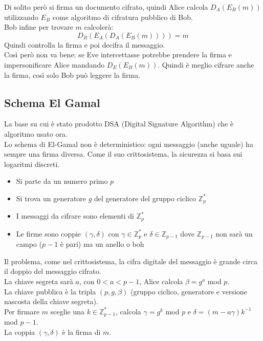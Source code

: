 Di solito però si firma un documento cifrato, quindi Alice calcola $D_A(E_B(m))$ utilizzando $E_B$ come algoritmo di cifratura pubblico di Bob. \\
Bob infine per trovare $m$ calcolerà:
\begin{equation*}
	D_B(E_A(D_A(E_B(m)))) = m
\end{equation*}
Quindi controlla la firma e poi decifra il messaggio.\\


Così però non va bene: se Eve intercettasse potrebbe prendere la firma e impersonificare Alice mandando $D_E(E_B(m))$. Quindi è meglio cifrare anche la firma, così solo Bob può leggere la firma.

\subsection*{Schema El Gamal}

La base su cui è stato prodotto DSA (Digital Signature Algorithm) che è algoritmo usato ora.\\
Lo schema di El-Gamal non è deterministico: ogni messaggio (anche uguale) ha sempre una firma diversa. Come il suo crittosistema, la sicurezza si basa sui logaritmi discreti.
\begin{itemize}
	\item Si parte da un numero primo $p$
	\item Si trova un generatore $g$ del generatore del gruppo ciclico $\mathbb{Z}_p^*$
	\item I messaggi da cifrare sono elementi di $\mathbb{Z}_p^*$
	\item Le firme sono coppie $(\gamma, \delta)$ con $\gamma \in \mathbb{Z}_p^*$ e $\delta \in \mathbb{Z}_{p-1}$ dove $\mathbb{Z}_{p-1}$ non sarà un campo ($p-1$ è pari) ma un anello o boh 
\end{itemize}

Il problema, come nel crittosistema, la cifra digitale del messaggio è grande circa il doppio del messaggio cifrato.\\

La chiave segreta sarà $a$, con $0<a<p-1$, Alice calcola $\beta=g^a$ mod $p$.\\
La chiave pubblica è la tripla $(p, g, \beta)$ (gruppo ciclico, generatore e versione nascosta della chiave segreta).\\
Per firmare $m$ sceglie una $k \in \mathbb{Z}_{p-1}^*$, calcola $\gamma=g^k$ mod $p$ e $\delta = (m-a\gamma)k^{-1}$ mod $p-1$.\\
La coppia $(\gamma, \delta)$ è la firma di $m$.\\

